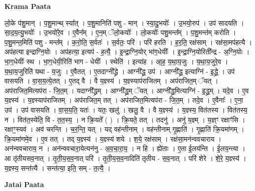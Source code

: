 \documentclass[17pt]{extarticle}
\begin{document}
\textbf{Krama Paata} \newline

लो॒के प॑शु॒मान् । प॒शु॒मान्थ् स्या᳚त् । प॒शु॒मानिति॑ पशु - मान् । स्या॒दु॒भयोः᳚ । उ॒भयो॒रुप॑ । उप॑ सादयति । सा॒द॒य॒त्यु॒भयोः᳚ । उ॒भयो॑रे॒व । ए॒वैन᳚म् । ए॒न॒म् ॅलो॒कयोः᳚ । लो॒कयोः᳚ पशु॒मन्त᳚म् । प॒शु॒मन्त॑म् करोति । प॒शु॒मन्त॒मिति॑ पशु - मन्त᳚म् । क॒रो॒ति॒ स॒र्वतः॑ । स॒र्वतः॒ परि॑ । परि॑ हरति । ह॒र॒ति॒ रक्ष॑साम् । रक्ष॑सा॒मप॑हत्यै । अप॑हत्या इन्द्राग्नि॒योः । अप॑हत्या॒ इत्यप॑ - ह॒त्यै॒ । इ॒न्द्रा॒ग्नि॒योर् भा॑ग॒धेयीः᳚ । इ॒न्द्रा॒ग्नि॒योरिती᳚न्द्र - अ॒ग्नि॒योः । भा॒ग॒धेयीः᳚ स्थ । भा॒ग॒धेयी॒रिति॑ भाग - धेयीः᳚ । स्थेति॑ । इत्या॑ह । आ॒ह॒ य॒था॒य॒जुः । य॒था॒य॒जुरे॒व । य॒था॒य॒जुरिति॑ यथा - य॒जुः । ए॒वैतत् । ए॒तदाग्नी᳚द्ध्रे । आग्नी᳚द्ध्र॒ उप॑ । आग्नी᳚द्ध्र॒ इत्याग्नि॑ - इ॒द्ध्रे॒ । उप॑ वासयति । वा॒स॒य॒त्ये॒तत् । ए॒तद् वै । वै य॒ज्ञ्स्य॑ । य॒ज्ञ्स्याप॑राजितम् । अप॑राजित॒म् ॅयत् । अप॑राजित॒मित्यप॑रा - जि॒त॒म् । यदाग्नी᳚द्ध्रम् । आग्नी᳚द्ध्र॒म् ॅयत् । आग्नी᳚द्ध्र॒मित्याग्नि॑ - इ॒द्ध्र॒म् । यदे॒व । ए॒व य॒ज्ञ्स्य॑ । य॒ज्ञ्स्याप॑राजितम् । अप॑राजित॒म् तत् । अप॑राजित॒मित्यप॑रा - जि॒त॒म् । तदे॒व । ए॒वैनाः᳚ । ए॒ना॒ उप॑ । उप॑ वासयति । वा॒स॒य॒ति॒ यतः॑ । यतः॒ खलु॑ । खलु॒ वै । वै य॒ज्ञ्स्य॑ । य॒ज्ञ्स्य॒ वित॑तस्य । वित॑तस्य॒ न । वित॑त॒स्येति॒ वि - त॒त॒स्य॒ । न क्रि॒यते᳚ ( ) । क्रि॒यते॒ तत् । तदनु॑ । अनु॑ य॒ज्ञ्म् । य॒ज्ञ्ꣳ रक्षाꣳ॑सि । रक्षाꣳ॒॒स्यव॑ । अव॑ चरन्ति । च॒र॒न्ति॒ यत् । यद् वह॑न्तीनाम् । वह॑न्तीनाम् गृ॒ह्णाति॑ । गृ॒ह्णाति॑ क्रि॒यमा॑णम् । क्रि॒यमा॑णमे॒व । ए॒व तत् । तद् य॒ज्ञ्स्य॑ । य॒ज्ञ्स्य॑ शये । श॒ये॒ रक्ष॑साम् । रक्ष॑सा॒मन॑न्ववचाराय । अन॑न्ववचाराय॒ न । अन॑न्ववचारा॒येत्यन॑नु - अ॒व॒चा॒रा॒य॒ । न हि । ह्ये॑ताः । ए॒ता ई॒लय॑न्ति । ई॒लय॒न्त्या । आ तृ॑तीयसव॒नात् । तृ॒ती॒य॒स॒व॒नात् परि॑ । तृ॒ती॒य॒स॒व॒नादिति॑ तृतीय - स॒व॒नात् । परि॑ शेरे । शे॒रे॒ य॒ज्ञ्स्य॑ । य॒ज्ञ्स्य॒ सन्त॑त्यै । सन्त॑त्या॒ इति॒ सम् - त॒त्यै॒ । \newline

\textbf{Jatai Paata} \newline
\end{document}
